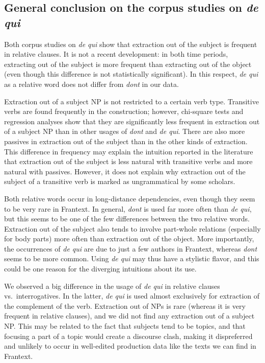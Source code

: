 \subsection{General conclusion on the corpus studies on \emph{de qui}}

Both corpus studies on \emph{de qui} show that extraction out of the subject is frequent in relative clauses. It is not a recent development: in both time periods, extracting out of the subject is more frequent than extracting out of the object (even though this difference is not statistically significant). In this respect, \emph{de qui} as a relative word does not differ from \emph{dont} in our data.

Extraction out of a subject NP is not restricted to a certain verb type. Transitive verbs are found frequently in the construction; however, chi-square tests and regression analyses show that they are significantly less frequent in extraction out of a subject NP than in other usages of \emph{dont} and \emph{de qui}. There are also more passives in extraction out of the subject than in the other kinds of extraction. This difference in frequency may explain the intuition reported in the literature that extraction out of the subject is less natural with transitive verbs and more natural with passives. However, it does not explain why extraction out of the subject of a transitive verb is marked as ungrammatical by some scholars.

\begin{sloppypar}
Both relative words occur in long-distance dependencies, even though they seem to be very rare in Frantext.
In general, \emph{dont} is used far more often than \emph{de qui}, but this seems to be one of the few differences between the two relative words. Extraction out of the subject also tends to involve part-whole relations (especially for body parts)  more often than extraction out of the object. More importantly, the occurrences of \emph{de qui} are due to just a few authors in Frantext, whereas \emph{dont} seems to be more common. Using \emph{de qui} may thus have a stylistic flavor, and this could be one reason for the diverging intuitions about its use.
\end{sloppypar}

We observed a big difference in the usage of \emph{de qui} in relative clauses vs.\ interrogatives. In the latter, \emph{de qui} is used almost exclusively for extraction of the complement of the verb. Extraction out of NPs is rare (whereas it is very frequent in relative clauses), and we did not find any extraction out of a subject NP. This may be related to the fact that subjects tend to be topics, and that focusing a part of a topic would create a discourse clash, making it dispreferred and unlikely to occur in well-edited production data like the texts we can find in Frantext. 
